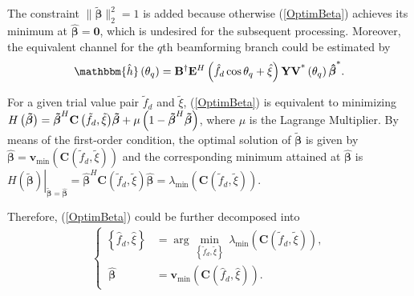 \documentclass[12pt, draftclsnofoot, onecolumn]{IEEEtran}
\begin{document}
The constraint $\big\| {\boldsymbol{\tilde{\beta }}} \big\|_{2}^{2}=1$ is added because otherwise (\ref{OptimBeta}) achieves its minimum at $\boldsymbol{\hat{\beta }}=\mathbf{0}$, which is undesired for the subsequent processing. Moreover, the equivalent channel for the $q$th beamforming branch could be estimated by
\begin{align}\label{MLChannel}
\mathbbm{\hat{h}}\left( \theta_{q} \right)={{\mathbf{B}}^{\dagger }}{{\mathbf{E}}^{H}}\left( {\hat{f}_d} \cos \theta_{q} + \hat{\xi}  \right)\mathbf{Y}{{\mathbf{V}}^{\text{*}}}\left( \theta_{q} \right){{\boldsymbol{\hat{\beta} }}^{\text{*}}}.
\end{align}

For a given trial value pair ${{{\tilde{f}}}_{d}}$ and $\tilde{\xi}$, (\ref{OptimBeta}) is equivalent to minimizing $H\left( \boldsymbol{\tilde{\beta} } \right)= {{{\boldsymbol{\tilde{\beta }}}}^{H}}{\mathbf{C}\left( {{{\tilde{f}}}_{d}}, \tilde{\xi } \right)}\boldsymbol{\tilde{\beta }} \\
+\mu \left( 1-{{\boldsymbol{\tilde{\beta} }}^{H}}\boldsymbol{\tilde{\beta} } \right)$, where $\mu$ is the Lagrange Multiplier. By means of the first-order condition, the optimal solution of $\boldsymbol{\tilde{\beta} }$ is given by $\boldsymbol{\hat{\beta}}={{\mathbf{v}}_{\min }}\left( {\mathbf{C}\left( {{{\tilde{f}}}_{d}}, \tilde{\xi } \right)}\right)$ and the corresponding minimum attained at $\boldsymbol{\hat{\beta}}$ is ${{\left. H\left( {\boldsymbol{\tilde{\beta }}} \right) \right|}_{\boldsymbol{\tilde{\beta }}=\boldsymbol{\hat{\beta }}}}={{\boldsymbol{\hat{\beta }}}^{H}}\mathbf{C}\left( {{{\tilde{f}}}_{d}},\tilde{\xi } \right)\boldsymbol{\hat{\beta }}={{\lambda }_{\min }}\left( \mathbf{C}\left( {{{\tilde{f}}}_{d}},\tilde{\xi } \right) \right)$.

Therefore, (\ref{OptimBeta}) could be further decomposed into
\begin{eqnarray}
\left\{
\begin{array}{lll}
\!\! \left\{{{\hat{f}}}_{d}, \hat{\xi }\right\}& \!\!\!\!=\arg \underset{\left\{{{\tilde{f}}}_{d}, \tilde{\xi}\right\}}{\mathop{\min }}\,{{\lambda }_{\min }}\left( {\mathbf{C}\left( {{{\tilde{f}}}_{d}}, \tilde{\xi } \right)} \right), \\
\!\! \ \boldsymbol{\hat{\beta }}&\!\!\!\!={{\mathbf{v}}_{\min }}\left( {\mathbf{C}\left( {{{\hat{f}}}_{d}}, \hat{\xi } \right)} \right).
\end{array}
\right.
\end{eqnarray}
\end{document}

